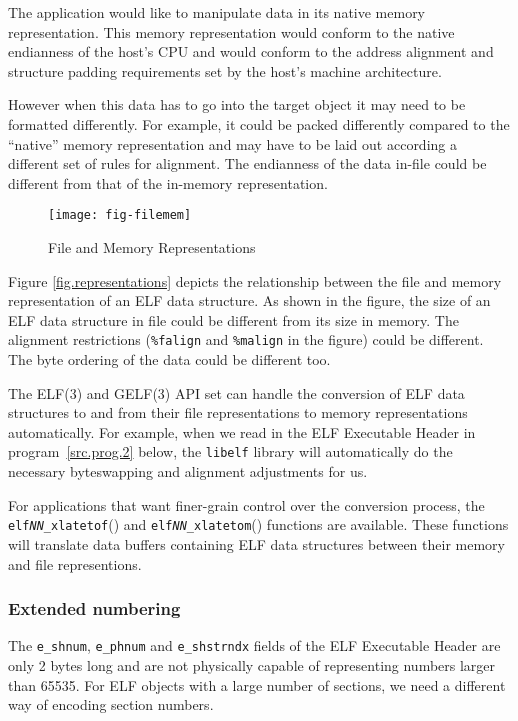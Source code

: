 \documentclass[a4paper]{book}
\newcommand{\function}[1]{\texttt{#1}()}
\newcommand{\library}[1]{\texttt{#1}}
\newcommand{\parameter}[1]{\texttt{#1}}
\begin{document}
The application would like to manipulate data in its native memory
representation.  This memory representation would conform to the
native endianness of the host's CPU and would conform to the address
alignment and structure padding requirements set by the host's machine
architecture.

However when this data has to go into the target object it may need to
be formatted differently.  For example, it could be packed differently
compared to the ``native'' memory representation and may have to be
laid out according a different set of rules for alignment.  The
endianness of the data in-file could be different from that of the
in-memory representation.

\begin{figure}
  \caption{File and Memory Representations}\label{fig.representations}
  \begin{center}
    \texttt{[image: fig-filemem]}
  \end{center}
\end{figure}

Figure \vref{fig.representations} depicts the relationship between the
file and memory representation of an ELF data structure.  As shown in
the figure, the size of an ELF data structure in file could be
different from its size in memory.  The alignment restrictions
(\parameter{\%falign} and \parameter{\%malign} in the figure) could be
different.  The byte ordering of the data could be different too.

The ELF(3) and GELF(3) API set can handle the conversion of ELF data
structures to and from their file representations to memory
representations automatically.  For example, when we read in the ELF
Executable Header in program~\vref{src.prog.2} below, the \library{libelf}
library will automatically do the necessary byteswapping and alignment
adjustments for us.

For applications that want finer-grain control over the conversion
process, the \function{elf\textit{NN}\_xlatetof} and
\function{elf\textit{NN}\_xlatetom} functions are available.  These
functions will translate data buffers containing ELF data structures
between their memory and file representions.

\subsubsection{Extended numbering}\label{sec.extended-numbering}
        
The \parameter{e\_shnum}, \parameter{e\_phnum} and
\parameter{e\_shstrndx} fields of the ELF Executable Header are only 2
bytes long and are not physically capable of representing numbers
larger than 65535.  For ELF objects with a large number of sections,
we need a different way of encoding section numbers.
\end{document}
